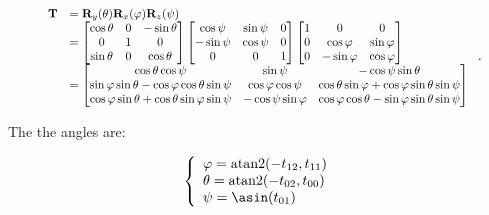     \begin{equation}
        \scalebox{0.85}{
            $ \begin{array}{ll}
                \mathbf{T}
                &= \mathbf{R}_{y}(\theta)\mathbf{R}_{x}(\varphi)\mathbf{R}_{z}(\psi) \\
                &=
                \begin{bmatrix}
                    \cos \theta & 0 & -\sin \theta \\
                    0 & 1 & 0 \\
                    \sin \theta & 0 & \cos \theta
                \end{bmatrix}
                \begin{bmatrix}
                    \cos \psi & \sin \psi & 0 \\
                    -\sin \psi & \cos \psi & 0 \\
                    0 & 0 & 1
                \end{bmatrix}
                \begin{bmatrix}
                    1 & 0 & 0 \\
                    0 & \cos \varphi & \sin \varphi \\
                    0 & -\sin \varphi & \cos \varphi
                \end{bmatrix} \\
                &=
                \begin{bmatrix}
                    \cos \theta \cos \psi
                    &  \sin \psi
                    & -\cos \psi \sin \theta \\
                    \sin \varphi \sin \theta - \cos \varphi \cos \theta \sin \psi
                    & \cos \varphi \cos \psi
                    & \cos \theta \sin \varphi + \cos \varphi \sin \theta \sin \psi \\
                    \cos \varphi \sin \theta + \cos \theta \sin \varphi \sin \psi
                    & -\cos \psi \sin \varphi
                    & \cos \varphi \cos \theta - \sin \varphi \sin \theta \sin \psi
                \end{bmatrix}
            \end{array} $
        }
    .\end{equation}

    The the angles are:

    \begin{equation}
        \left\{ \begin{array}{l}
            \varphi = \atantwo(-t_{12}, t_{11}) \\
            \theta = \atantwo(-t_{02}, t_{00}) \\
            \psi = \asin(t_{01})
        \end{array} \right.
    \end{equation}

